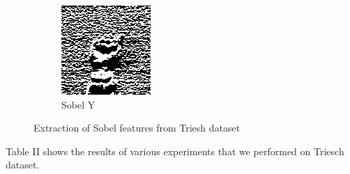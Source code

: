\documentclass[conference]{IEEEtran}
\begin{document}
\begin{figure}[h]
\begin{subfigure}{.1\textwidth}
  \includegraphics[width=.8\linewidth]{trieshsobely}
  \caption{Sobel Y}
  \label{fig:sub2}
\end{subfigure}%
\captionsetup{justification=centering}
\caption{Extraction of Sobel features from Triesh dataset}
\label{fig:test}
\end{figure}

Table II shows the results of various experiments that we performed on Triesch dataset.
\end{document}
